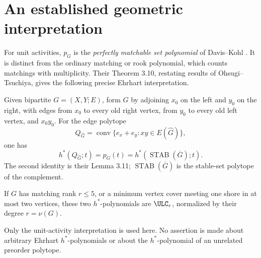\section{An established geometric interpretation}\label{sec:geometry}
For unit activities, $p_G$ is the \emph{perfectly matchable set polynomial} of Davis--Kohl \cite{DK}. It is distinct from the ordinary matching or rook polynomial, which counts matchings with multiplicity. Their Theorem 3.10, restating results of Ohsugi--Tsuchiya, gives the following precise Ehrhart interpretation.

Given bipartite $G=(X,Y;E)$, form $\widehat G$ by adjoining $x_0$ on the left and $y_0$ on the right, with edges from $x_0$ to every old right vertex, from $y_0$ to every old left vertex, and $x_0y_0$. For the edge polytope
\[
 Q_{\widehat G}=\operatorname{conv}\{e_x+e_y:xy\in E(\widehat G)\},
\]
one has
\[
 h^*(Q_{\widehat G};t)=p_G(t)=h^*(\operatorname{STAB}(\overline G);t).
\]
The second identity is their Lemma 3.11; $\operatorname{STAB}(\overline G)$ is the stable-set polytope of the complement.

\begin{corollary}
If $G$ has matching rank $r\le5$, or a minimum vertex cover meeting one shore in at most two vertices, these two $h^*$-polynomials are $\ULC_r$, normalized by their degree $r=\nu(G)$.
\end{corollary}
Only the unit-activity interpretation is used here. No assertion is made about arbitrary Ehrhart $h^*$-polynomials or about the $h^*$-polynomial of an unrelated preorder polytope.
